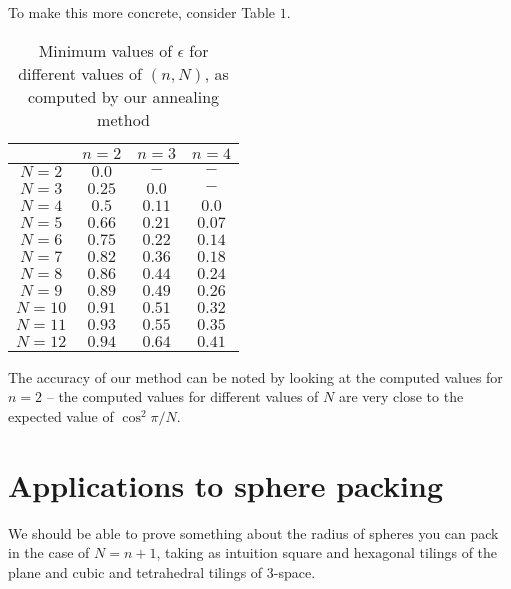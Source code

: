 \documentclass[11pt,letterpaper,twoside,english]{article}
\theoremstyle{theorem}
\theoremstyle{remark}
\begin{document}
To make this more concrete, consider Table $1$.
\begin{table}
   \centering
    \begin{tabular}{ | c | c | c | c |}
    \hline
      & $n=2$ & $n=3$ & $n=4$ \\ \hline
    $N=2$ & $0.0$ & $-$ & $-$ \\ \hline
    $N=3$ & $0.25$ & $0.0$ & $-$ \\ \hline
    $N=4$ & $0.5$ & $0.11$ & $0.0$ \\ \hline
    $N=5$ & $0.66$ & $0.21$ & $0.07$ \\ \hline
    $N=6$ & $0.75$ & $0.22$ & $0.14$ \\ \hline
    $N=7$ & $0.82$ & $0.36$ & $0.18$ \\ \hline
    $N=8$ &  $0.86$ & $0.44$ & $0.24$ \\ \hline
    $N=9$ &  $0.89$ & $0.49$ & $0.26$ \\ \hline
    $N=10$ & $0.91$ & $0.51$ & $0.32$ \\ \hline
    $N=11$ & $0.93$  & $0.55$ & $0.35$ \\ \hline
    $N=12$ & $0.94$ & $0.64$ & $0.41$ \\
    \hline
    \end{tabular}
    \caption {Minimum values of $\epsilon$ for different values of $(n, N)$, as computed by our annealing method}
\end{table}

The accuracy of our method can be noted by looking at the computed values for $n=2$ -- the computed values for different values of $N$ are very close to the expected value of $\cos^2 \pi/N$.
\section{Applications to sphere packing}
We should be able to prove something about the radius of spheres you can pack in the case of $N=n+1$, taking as intuition square and hexagonal tilings of the plane and cubic and tetrahedral tilings of 3-space. 
\end{document}
